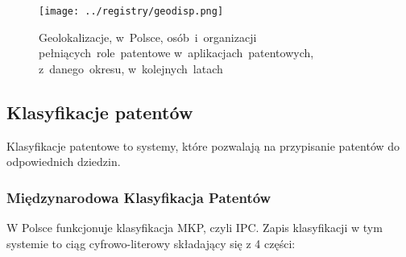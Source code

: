 \begin{figure}[H]\centering
\texttt{[image: ../registry/geodisp.png]}
\caption{Geolokalizacje,
         w~Polsce,
         osób~i~organizacji 
         pełniących~role~patentowe 
         w~aplikacjach~patentowych,
         z~danego~okresu,
         w~kolejnych~latach}
\label{fig:geodisp.png}
\end{figure}



\subsection{Klasyfikacje patentów}

Klasyfikacje patentowe to systemy, które pozwalają na przypisanie
patentów do odpowiednich dziedzin.



\subsubsection{Międzynarodowa Klasyfikacja Patentów}

W Polsce funkcjonuje klasyfikacja
\ac{MKP}, czyli \ac{IPC}. Zapis klasyfikacji w tym systemie to ciąg
cyfrowo-literowy składający się z 4 części:

